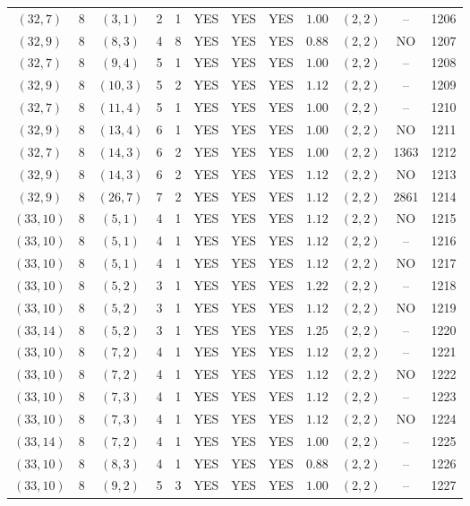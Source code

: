 \begin{longtable}{|c|c|c|c|c|c|c|c|c|c|c|c|}
$(32,7)$ & 8 & $(3,1)$ & 2 & 1 & YES & YES & YES & $1.00$ & $(2,2)$ & -- & 1206\\
$(32,9)$ & 8 & $(8,3)$ & 4 & 8 & YES & YES & YES & $0.88$ & $(2,2)$ & NO & 1207\\
$(32,7)$ & 8 & $(9,4)$ & 5 & 1 & YES & YES & YES & $1.00$ & $(2,2)$ & -- & 1208\\
$(32,9)$ & 8 & $(10,3)$ & 5 & 2 & YES & YES & YES & $1.12$ & $(2,2)$ & -- & 1209\\
$(32,7)$ & 8 & $(11,4)$ & 5 & 1 & YES & YES & YES & $1.00$ & $(2,2)$ & -- & 1210\\
$(32,9)$ & 8 & $(13,4)$ & 6 & 1 & YES & YES & YES & $1.00$ & $(2,2)$ & NO & 1211\\
$(32,7)$ & 8 & $(14,3)$ & 6 & 2 & YES & YES & YES & $1.00$ & $(2,2)$ & 1363 & 1212\\
$(32,9)$ & 8 & $(14,3)$ & 6 & 2 & YES & YES & YES & $1.12$ & $(2,2)$ & NO & 1213\\
$(32,9)$ & 8 & $(26,7)$ & 7 & 2 & YES & YES & YES & $1.12$ & $(2,2)$ & 2861 & 1214\\
$(33,10)$ & 8 & $(5,1)$ & 4 & 1 & YES & YES & YES & $1.12$ & $(2,2)$ & NO & 1215\\
$(33,10)$ & 8 & $(5,1)$ & 4 & 1 & YES & YES & YES & $1.12$ & $(2,2)$ & -- & 1216\\
$(33,10)$ & 8 & $(5,1)$ & 4 & 1 & YES & YES & YES & $1.12$ & $(2,2)$ & NO & 1217\\
$(33,10)$ & 8 & $(5,2)$ & 3 & 1 & YES & YES & YES & $1.22$ & $(2,2)$ & -- & 1218\\
$(33,10)$ & 8 & $(5,2)$ & 3 & 1 & YES & YES & YES & $1.12$ & $(2,2)$ & NO & 1219\\
$(33,14)$ & 8 & $(5,2)$ & 3 & 1 & YES & YES & YES & $1.25$ & $(2,2)$ & -- & 1220\\
$(33,10)$ & 8 & $(7,2)$ & 4 & 1 & YES & YES & YES & $1.12$ & $(2,2)$ & -- & 1221\\
$(33,10)$ & 8 & $(7,2)$ & 4 & 1 & YES & YES & YES & $1.12$ & $(2,2)$ & NO & 1222\\
$(33,10)$ & 8 & $(7,3)$ & 4 & 1 & YES & YES & YES & $1.12$ & $(2,2)$ & -- & 1223\\
$(33,10)$ & 8 & $(7,3)$ & 4 & 1 & YES & YES & YES & $1.12$ & $(2,2)$ & NO & 1224\\
$(33,14)$ & 8 & $(7,2)$ & 4 & 1 & YES & YES & YES & $1.00$ & $(2,2)$ & -- & 1225\\
$(33,10)$ & 8 & $(8,3)$ & 4 & 1 & YES & YES & YES & $0.88$ & $(2,2)$ & -- & 1226\\
$(33,10)$ & 8 & $(9,2)$ & 5 & 3 & YES & YES & YES & $1.00$ & $(2,2)$ & -- & 1227\\

\end{longtable}

